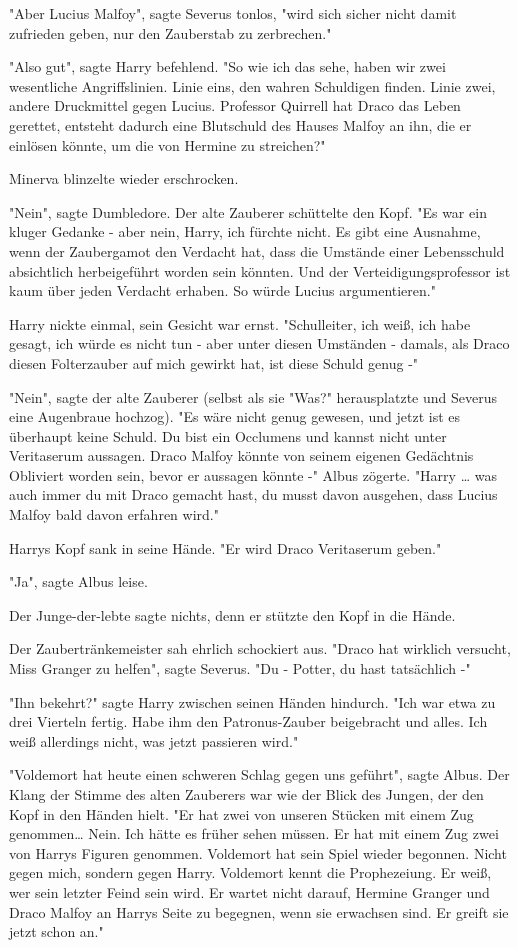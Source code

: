 {"Aber Lucius Malfoy", sagte Severus tonlos, "wird sich sicher nicht damit zufrieden geben, nur den Zauberstab zu zerbrechen."

"Also gut", sagte Harry befehlend. "So wie ich das sehe, haben wir zwei wesentliche Angriffslinien. Linie eins, den wahren Schuldigen finden. Linie zwei, andere Druckmittel gegen Lucius. Professor Quirrell hat Draco das Leben gerettet, entsteht dadurch eine Blutschuld des Hauses Malfoy an ihn, die er einlösen könnte, um die von Hermine zu streichen?"

Minerva blinzelte wieder erschrocken.

"Nein", sagte Dumbledore. Der alte Zauberer schüttelte den Kopf. "Es war ein kluger Gedanke - aber nein, Harry, ich fürchte nicht. Es gibt eine Ausnahme, wenn der Zaubergamot den Verdacht hat, dass die Umstände einer Lebensschuld absichtlich herbeigeführt worden sein könnten. Und der Verteidigungsprofessor ist kaum über jeden Verdacht erhaben. So würde Lucius argumentieren."

Harry nickte einmal, sein Gesicht war ernst. "Schulleiter, ich weiß, ich habe gesagt, ich würde es nicht tun - aber unter diesen Umständen - damals, als Draco diesen Folterzauber auf mich gewirkt hat, ist diese Schuld genug -"

"Nein", sagte der alte Zauberer (selbst als sie "Was?" herausplatzte und Severus eine Augenbraue hochzog). "Es wäre nicht genug gewesen, und jetzt ist es überhaupt keine Schuld. Du bist ein Occlumens und kannst nicht unter Veritaserum aussagen. Draco Malfoy könnte von seinem eigenen Gedächtnis Obliviert worden sein, bevor er aussagen könnte -" Albus zögerte. "Harry … was auch immer du mit Draco gemacht hast, du musst davon ausgehen, dass Lucius Malfoy bald davon erfahren wird."

Harrys Kopf sank in seine Hände. "Er wird Draco Veritaserum geben."

"Ja", sagte Albus leise.

Der Junge-der-lebte sagte nichts, denn er stützte den Kopf in die Hände.

Der Zaubertränkemeister sah ehrlich schockiert aus. "Draco hat wirklich versucht, Miss Granger zu helfen", sagte Severus. "Du - Potter, du hast tatsächlich -"

"Ihn bekehrt?" sagte Harry zwischen seinen Händen hindurch. "Ich war etwa zu drei Vierteln fertig. Habe ihm den Patronus-Zauber beigebracht und alles. Ich weiß allerdings nicht, was jetzt passieren wird."

"Voldemort hat heute einen schweren Schlag gegen uns geführt", sagte Albus. Der Klang der Stimme des alten Zauberers war wie der Blick des Jungen, der den Kopf in den Händen hielt. "Er hat zwei von unseren Stücken mit einem Zug genommen… Nein. Ich hätte es früher sehen müssen. Er hat mit einem Zug zwei von Harrys Figuren genommen. Voldemort hat sein Spiel wieder begonnen. Nicht gegen mich, sondern gegen Harry. Voldemort kennt die Prophezeiung. Er weiß, wer sein letzter Feind sein wird. Er wartet nicht darauf, Hermine Granger und Draco Malfoy an Harrys Seite zu begegnen, wenn sie erwachsen sind. Er greift sie jetzt schon an."

}
